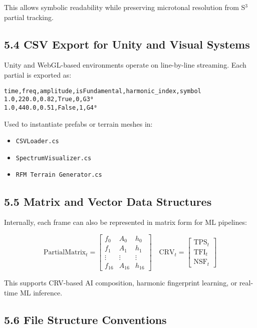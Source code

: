 \documentclass[10pt]{article}
\begin{document}
This allows symbolic readability while preserving microtonal resolution from S$^{3}$ partial tracking.

\subsection*{5.4 CSV Export for Unity and Visual Systems}

Unity and WebGL-based environments operate on line-by-line streaming. Each partial is exported as:

\begin{verbatim}
time,freq,amplitude,isFundamental,harmonic_index,symbol
1.0,220.0,0.82,True,0,G3⁰
1.0,440.0,0.51,False,1,G4⁰
\end{verbatim}

Used to instantiate prefabs or terrain meshes in:

\begin{itemize}
    \item \texttt{CSVLoader.cs}
    \item \texttt{SpectrumVisualizer.cs}
    \item \texttt{RFM Terrain Generator.cs}
\end{itemize}

\subsection*{5.5 Matrix and Vector Data Structures}

Internally, each frame can also be represented in matrix form for ML pipelines:

\[
\text{PartialMatrix}_t = 
\begin{bmatrix}
f_0 & A_0 & h_0 \\
f_1 & A_1 & h_1 \\
\vdots & \vdots & \vdots \\
f_{16} & A_{16} & h_{16}
\end{bmatrix}
\quad
\text{CRV}_t = 
\begin{bmatrix}
\text{TPS}_t \\
\text{TFI}_t \\
\text{NSF}_t
\end{bmatrix}
\]

This supports CRV-based AI composition, harmonic fingerprint learning, or real-time ML inference.

\subsection*{5.6 File Structure Conventions}
\end{document}
